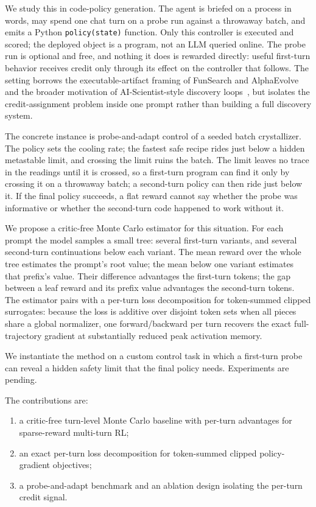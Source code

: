 \documentclass[11pt,a4paper]{article}
\begin{document}
We study this in code-policy generation. The agent is briefed on a process in words, may spend one chat turn on a probe run against a throwaway batch, and emits a Python \texttt{policy(state)} function. Only this controller is executed and scored; the deployed object is a program, not an LLM queried online. The probe run is optional and free, and nothing it does is rewarded directly: useful first-turn behavior receives credit only through its effect on the controller that follows. The setting borrows the executable-artifact framing of FunSearch and AlphaEvolve and the broader motivation of AI-Scientist-style discovery loops~\cite{romera-paredes2024funsearch,novikov2025alphaevolve,lu2024aiscientist}, but isolates the credit-assignment problem inside one prompt rather than building a full discovery system.

The concrete instance is probe-and-adapt control of a seeded batch crystallizer. The policy sets the cooling rate; the fastest safe recipe rides just below a hidden metastable limit, and crossing the limit ruins the batch. The limit leaves no trace in the readings until it is crossed, so a first-turn program can find it only by crossing it on a throwaway batch; a second-turn policy can then ride just below it. If the final policy succeeds, a flat reward cannot say whether the probe was informative or whether the second-turn code happened to work without it.

We propose a critic-free Monte Carlo estimator for this situation. For each prompt the model samples a small tree: several first-turn variants, and several second-turn continuations below each variant. The mean reward over the whole tree estimates the prompt's root value; the mean below one variant estimates that prefix's value. Their difference advantages the first-turn tokens; the gap between a leaf reward and its prefix value advantages the second-turn tokens. The estimator pairs with a per-turn loss decomposition for token-summed clipped surrogates: because the loss is additive over disjoint token sets when all pieces share a global normalizer, one forward/backward per turn recovers the exact full-trajectory gradient at substantially reduced peak activation memory.

We instantiate the method on a custom control task in which a first-turn probe can reveal a hidden safety limit that the final policy needs. Experiments are pending.

The contributions are:
\begin{enumerate}
  \item a critic-free turn-level Monte Carlo baseline with per-turn advantages for sparse-reward multi-turn RL;
  \item an exact per-turn loss decomposition for token-summed clipped policy-gradient objectives;
  \item a probe-and-adapt benchmark and an ablation design isolating the per-turn credit signal.
\end{enumerate}
\end{document}
